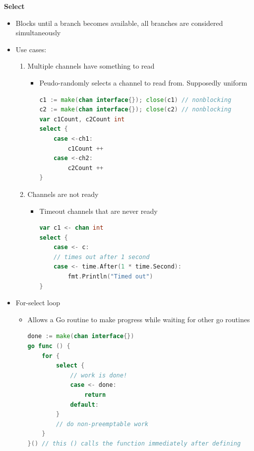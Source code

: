 \documentclass[10pt, landscape]{article}
\begin{document}
\begin{multicols}{4}
\textbf{Select} \\
\begin{itemize}
    \item Blocks until a branch becomes available, all branches are considered simultaneously
    \item Use cases:
    \begin{enumerate}
        \item Multiple channels have something to read
        \begin{itemize}
            \item Peudo-randomly selects a channel to read from. Supposedly uniform
            \begin{lstlisting}[language=Go, breaklines=true, breakatwhitespace=true]
c1 := make(chan interface{}); close(c1) // nonblocking
c2 := make(chan interface{}); close(c2) // nonblocking
var c1Count, c2Count int
select {
    case <-ch1:
        c1Count ++
    case <-ch2:
        c2Count ++
}
            \end{lstlisting}
        \end{itemize}
        \item Channels are not ready
        \begin{itemize}
            \item Timeout channels that are never ready
            \begin{lstlisting}[language=Go, breaklines=true, breakatwhitespace=true]
var c1 <- chan int 
select {
    case <- c:
    // times out after 1 second
    case <- time.After(1 * time.Second): 
        fmt.Println("Timed out")
}
            \end{lstlisting}
        \end{itemize}
    \end{enumerate}
    \item For-select loop 
    \begin{itemize}
        \item Allows a Go routine to make progress while waiting for other go routines 
        \begin{lstlisting}[language=Go, breaklines=true, breakatwhitespace=true]
done := make(chan interface{})
go func () {
    for {
        select {
            // work is done!
            case <- done:
                return
            default:
        }
        // do non-preemptable work
    }
}() // this () calls the function immediately after defining
        \end{lstlisting}
    \end{itemize}
\end{itemize}


\end{multicols}
\end{document}
